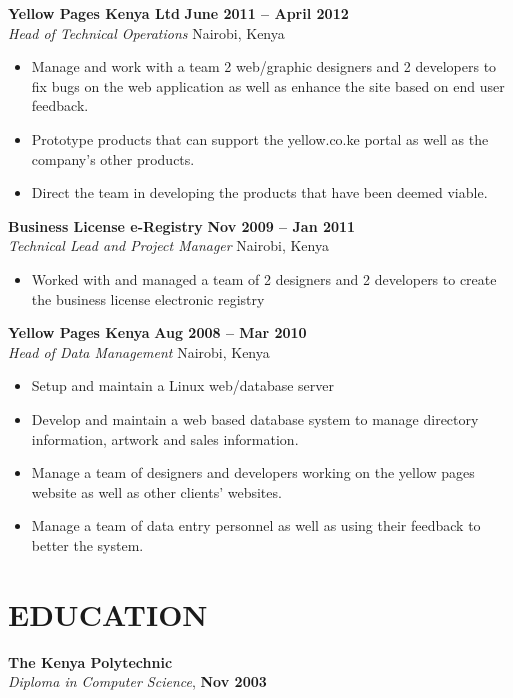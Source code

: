 \documentclass{res}
\begin{document}
\begin{resume}
\textbf{Yellow Pages Kenya Ltd} \hfill        \textbf{June 2011 – April 2012} \\
\emph{Head of Technical Operations}       \hfill   Nairobi, Kenya
   \begin{itemize} \itemsep -2pt %
	\item Manage and work with a team 2 web/graphic designers and 2 developers to fix bugs on the web application as well as enhance the site based on end user feedback.
	\item Prototype products that can support the yellow.co.ke portal as well as the company’s other products.
	\item Direct the team in developing the products that have been deemed viable.
 \end{itemize} \vspace{-4pt}

\textbf{Business License e-Registry} \hfill \textbf{Nov 2009 – Jan 2011} \\
\emph{Technical Lead and Project Manager} \hfill Nairobi, Kenya
 \begin{itemize} \itemsep -2pt
  \item  Worked with and managed a team of 2 designers and 2 developers to create the business license 
  electronic registry
\end{itemize} \vspace{-6pt}

\textbf{Yellow Pages Kenya} \hfill \textbf{Aug 2008 – Mar 2010} \\
\emph{Head of Data Management} \hfill Nairobi, Kenya
 \begin{itemize} \itemsep -2pt
  \item  Setup and maintain a Linux web/database server
  \item Develop and maintain a web based database system to manage directory information,
artwork and sales information.
\item Manage a team of designers and developers working on the yellow pages website as well
as other clients’ websites.
\item Manage a team of data entry personnel as well as using their feedback to better the system.
 \end{itemize} \vspace{-6pt}

\section{EDUCATION} 
\vspace{8pt} 
\textbf{The Kenya Polytechnic}  \\
\emph{Diploma in Computer Science}, \hfill \textbf{Nov 2003}


\end{resume}
\end{document}
